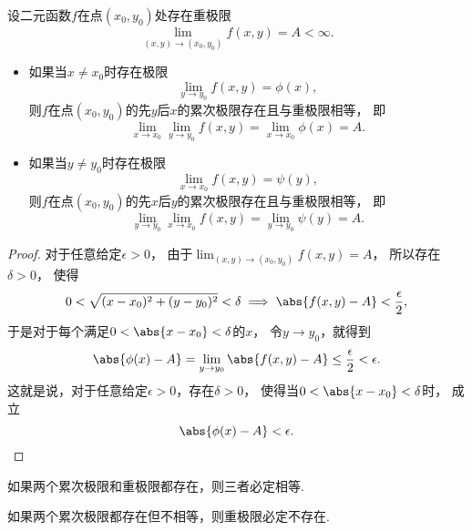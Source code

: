 \begin{theorem}\label{theorem:重极限.二元函数的重极限与累次极限的关系}
设二元函数\(f\)在点\((x_0,y_0)\)处存在重极限\[
	\lim_{(x,y)\to(x_0,y_0)} f(x,y) = A < \infty.
\]\begin{itemize}%
	\item 如果当\(x \neq x_0\)时存在极限\[
		\lim_{y \to y_0} f(x,y)
		= \phi(x),
	\]
	则\(f\)在点\((x_0,y_0)\)的先\(y\)后\(x\)的累次极限存在且与重极限相等，
	即\[
		\lim_{x \to x_0} \lim_{y \to y_0} f(x,y)
		= \lim_{x \to x_0} \phi(x)
		= A.
	\]

	\item 如果当\(y \neq y_0\)时存在极限\[
		\lim_{x \to x_0} f(x,y)
		= \psi(y),
	\]
	则\(f\)在点\((x_0,y_0)\)的先\(x\)后\(y\)的累次极限存在且与重极限相等，
	即\[
		\lim_{y \to y_0} \lim_{x \to x_0} f(x,y)
		= \lim_{y \to y_0} \psi(y)
		= A.
	\]
\end{itemize}
\begin{proof}
对于任意给定\(\epsilon>0\)，
由于\(\lim_{(x,y)\to(x_0,y_0)} f(x,y) = A\)，
所以存在\(\delta>0\)，
使得\[
	0<\sqrt{(x-x_0)^2+(y-y_0)^2}<\delta
	\implies
	\abs{f(x,y)-A}<\frac\epsilon2,
\]
于是对于每个满足\(0<\abs{x-x_0}<\delta\)的\(x\)，
令\(y \to y_0\)，就得到\[
	\abs{\phi(x)-A}
	= \lim_{y \to y_0} \abs{f(x,y)-A}
	\leq \frac\epsilon2
	< \epsilon.
\]
这就是说，对于任意给定\(\epsilon>0\)，存在\(\delta>0\)，
使得当\(0<\abs{x-x_0}<\delta\)时，
成立\[
	\abs{\phi(x)-A} < \epsilon.
	\qedhere
\]
\end{proof}
\end{theorem}

\begin{corollary}
如果两个累次极限和重极限都存在，则三者必定相等.
\end{corollary}

\begin{corollary}
如果两个累次极限都存在但不相等，则重极限必定不存在.
\end{corollary}
